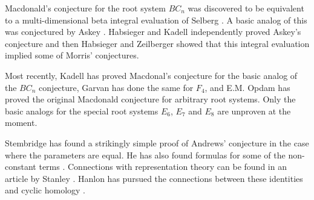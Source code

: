 Macdonald's conjecture for the root system $BC_n$ was discovered to be equivalent to a multi-dimensional beta integral evaluation of Selberg \cite{art4-key18, art4-key19}. A basic analog of this was conjectured by Askey \cite{art4-key2}. Habsieger \cite{art4-key8} and Kadell \cite{art4-key13} independently proved Askey's conjecture and then Habsieger \cite{art4-key9} and Zeilberger \cite{art4-key25} showed that this integral evaluation implied some of Morris' conjectures.

Most recently, Kadell \cite{art4-key14} has proved Macdonal's conjecture for the basic analog of the $BC_n$ conjecture, Garvan \cite{art4-key6} has done the same for $F_4$, and E.M. Opdam \cite{art4-key17} has proved the original Macdonald conjecture for arbitrary root systems. Only the basic analogs for the special root systems $E_6$, $E_7$ and $E_8$ are unproven at the moment.

Stembridge \cite{art4-key22} has found a strikingly simple proof of Andrews' conjecture in the case where the parameters are equal. He has also found formulas for some of the non-constant terms \cite{art4-key21}. Connections with representation theory can be found in an article by Stanley \cite{art4-key20}. Hanlon has pursued the connections between these identities and cyclic homology \cite{art4-key10, art4-key11}.


